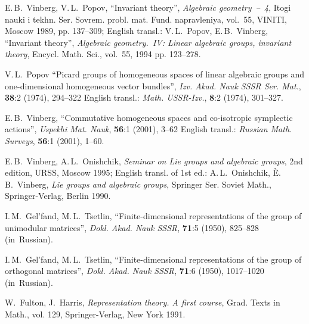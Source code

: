 \documentclass[12pt]{amsart}
\theoremstyle{definition}
\theoremstyle{remark}
\begin{document}
\begin{thebibliography}{99}
E.\,B.~Vinberg, V.\,L.~Popov, ``Invariant theory'', \emph{Algebraic
geometry~--~4}, Itogi nauki i tekhn. Ser. Sovrem. probl. mat. Fund.
napravleniya, vol.~55, VINITI, Moscow 1989, pp. 137--309; English
transl.: V.\,L.~Popov, E.\,B.~Vinberg, ``Invariant theory'',
\emph{Algebraic geometry.~IV: Linear algebraic groups, invariant
theory}, Encycl. Math. Sci., vol.~55, 1994 pp. 123--278.

V.\,L.~Popov ``Picard groups of homogeneous spaces of linear
algebraic groups and one-dimensional homogeneous vector bundles'',
\emph{Izv. Akad. Nauk SSSR Ser. Mat.}, \textbf{38}:2 (1974),
294--322 English transl.: \emph{Math. USSR-Izv.}, \textbf{8}:2
(1974), 301--327.

E.\,B.~Vinberg, ``Commutative homogeneous spaces and co-isotropic
symplectic actions'', \emph{Uspekhi Mat. Nauk}, \textbf{56}:1
(2001), 3--62 English transl.: \emph{Russian Math. Surveys},
\textbf{56}:1 (2001), 1--60.

E.\,B.~Vinberg, A.\,L.~Onishchik, \emph{Seminar on Lie groups and
algebraic groups}, 2nd edition, URSS, Moscow 1995; English transl.
of 1st ed.: A.\,L.~Onishchik, \`E.\,B.~Vinberg, \emph{Lie groups and
algebraic groups}, Springer Ser. Soviet Math., Springer-Verlag,
Berlin 1990.

I.\,M.~Gel'fand, M.\,L.~Tsetlin, ``Finite-dimensional
representations of the group of unimodular matrices'', \emph{Dokl.
Akad. Nauk SSSR}, \textbf{71}:5 (1950), 825--828 (in~Russian).

I.\,M.~Gel'fand, M.\,L.~Tsetlin, ``Finite-dimensional
representations of the group of orthogonal matrices'', \emph{Dokl.
Akad. Nauk SSSR}, \textbf{71}:6 (1950), 1017--1020 (in~Russian).

W.~Fulton, J.~Harris, \emph{Representation theory. A first course},
Grad. Texts in Math., vol. 129, Springer-Verlag, New York 1991.

\end{thebibliography}
\end{document}

